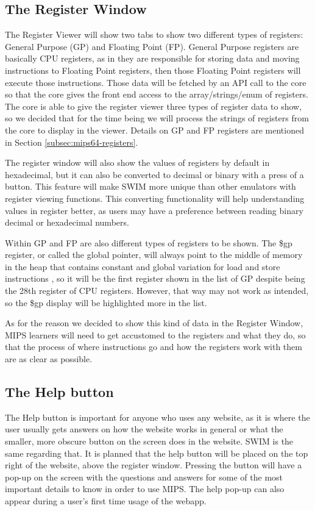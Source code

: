 \documentclass[
    parskip=half,
    fontsize=12pt,
    titlepage=firstiscover,
    toc=bibliography,
    numbers=endperiod
]{scrartcl}
\begin{document}
\subsection{The Register Window}

The Register Viewer will show two tabs to show two different types of
registers: General Purpose (GP) and Floating Point (FP). General Purpose
registers are basically CPU registers, as in they are responsible for
storing data and moving instructions to Floating Point registers, then
those Floating Point registers will execute those instructions. Those
data will be fetched by an API call to the core so that the core gives
the front end access to the array/strings/enum of registers. The core is
able to give the register viewer three types of register data to show,
so we decided that for the time being we will process the strings of
registers from the core to display in the viewer. Details on GP and FP
registers are mentioned in Section \ref{subsec:mips64-registers}.

The register window will also show the values of registers by default in
hexadecimal, but it can also be converted to decimal or binary with a
press of a button. This feature will make SWIM more unique than other
emulators with register viewing functions. This converting functionality
will help understanding values in register better, as users may have a
preference between reading binary decimal or hexadecimal numbers.

Within GP and FP are also different types of registers to be shown. The
\$gp register, or called the global pointer, will always point to the
middle of memory in the heap that contains constant and global variation
for load and store instructions \cite{moor2009}, so it will be the first register shown
in the list of GP despite being the 28th register of CPU registers.
However, that way may not work as intended, so the \$gp display will be
highlighted more in the list.

As for the reason we decided to show this kind of data in the Register
Window, MIPS learners will need to get accustomed to the registers and
what they do, so that the process of where instructions go and how the
registers work with them are as clear as possible.

\subsection{The Help button}

The Help button is important for anyone who uses any website, as it is
where the user usually gets answers on how the website works in general
or what the smaller, more obscure button on the screen does in the
website. SWIM is the same regarding that. It is planned that the help
button will be placed on the top right of the website, above the
register window. Pressing the button will have a pop-up on the screen
with the questions and answers for some of the most important details to
know in order to use MIPS. The help pop-up can also appear during a
user's first time usage of the webapp.
\end{document}
